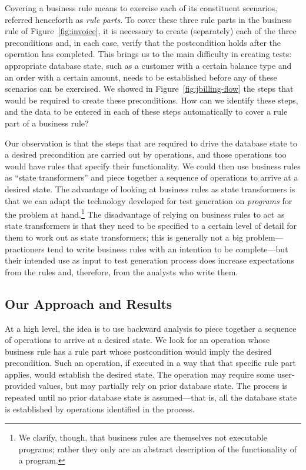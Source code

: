 Covering a business rule means to exercise each of its constituent scenarios,
referred henceforth as \textit{rule parts}.  To cover these three rule parts in
the business rule of Figure~\ref{fig:invoice}, it is necessary to create
(separately) each of the three preconditions and, in each case, verify that the
postcondition holds after the operation has completed.  This brings us to the
main difficulty in creating tests: appropriate database state, such as a
customer with a certain balance type and an order with a certain amount, needs
to be established before any of these scenarios can be exercised.  We showed in
Figure~\ref{fig:jbilling-flow} the steps that would be required to create these
preconditions.  How can we identify these steps, and the data to be entered in
each of these steps automatically to cover a rule part of a business rule?

Our observation is that the steps that are required to drive the database state
to a desired precondition are carried out by operations, and those operations
too would have rules that specify their functionality.  We could then use
business rules as ``state transformers'' and piece together a sequence of
operations to arrive at a desired state.  The advantage of looking at business
rules as state transformers is that we can adapt the technology developed for
test generation on \textit{programs} for the problem at hand.\footnote{\small We
  clarify, though, that business rules are themselves not executable programs;
  rather they only are an abstract description of the functionality of a
  program.}  The disadvantage of relying on business rules to act as state
transformers is that they need to be specified to a certain level of detail for
them to work out as state transformers; this is generally not a big
problem---practioners tend to write business rules with an intention to be
complete---but their intended use as input to test generation process does
increase expectations from the rules and, therefore, from the analysts who write
them.

\subsection{Our Approach and Results}

At a high level, the idea is to use backward analysis to piece together a
sequence of operations to arrive at a desired state.  We look for an operation
whose business rule has a rule part whose postcondition would imply the desired
precondition.  Such an operation, if executed in a way that that specific rule
part applies, would establish the desired state.  The operation may require some
user-provided values, but may partially rely on prior database state. The
process is repeated until no prior database state is assumed---that is, all the
database state is established by operations identified in the process.

